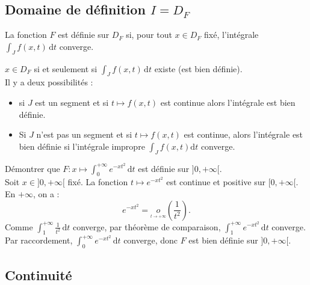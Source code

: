 \documentclass{book}
\begin{document}
\subsection{Domaine de définition $I=D_F$}
\begin{Proposition} 
La fonction $F$ est définie sur $D_F$ si, pour tout
$x\in D_F$ fixé, l'intégrale $\int_J f(x,t)\, \mathrm dt $ converge.
\end{Proposition}
\begin{Proposition} 
$x \in D_F$ si et seulement si  $\int_J f(x,t)\, \mathrm dt$ existe  (est bien définie).\\ 
Il y a deux possibilités :
\begin{itemize}
\item  si $J$ est un segment et si $t\mapsto f (x ,t )$ est continue alors l'intégrale est bien définie.
\item Si $J$ n'est pas un segment et si $t\mapsto f (x ,t )$ est continue, alors l'intégrale est bien définie si l'intégrale
impropre $\int_J f(x,t) \mathrm dt$ converge.
\end{itemize}
\end{Proposition}
\begin{Exemple}Démontrer que $F:x\mapsto \int_{0}^{+\infty} e^{-xt^2}\, \mathrm dt$ est définie sur $]0,+\infty[$.\\
Soit $x\in ]0,+\infty[$ fixé. La fonction $t\mapsto e^{-xt^2}$ est continue et positive sur $[0,+\infty[$.\\
En $+\infty$, on a : $$e^{-xt^2}={\underset {\overset {t\rightarrow +\infty }{}}{o}}\left(\frac{1}{t^2}\right).$$
Comme $\int_{1}^{+\infty} \frac{1}{t^2}\,\mathrm dt$ converge, par théorème de comparaison, $\int_{1}^{+\infty}e^{-xt^2}\, \mathrm dt$ converge. Par raccordement, $\int_{0}^{+\infty} e^{-xt^2}\, \mathrm dt$ converge, donc $F$ est bien définie sur   $]0,+\infty[$.
\end{Exemple}
\subsection{Continuité}
\end{document}
